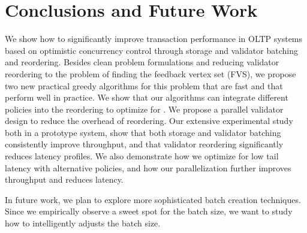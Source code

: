 \section{Conclusions and Future Work}\label{sec:conclusion}

We show how to significantly improve transaction performance in OLTP systems based on optimistic concurrency control through storage and validator batching and reordering. Besides clean problem formulations and
reducing validator reordering to the problem of finding the  feedback vertex set (FVS), we propose two new practical greedy algorithms for this problem
that are fast and that perform well in practice. We show that our algorithms can integrate different policies into the reordering to optimize for . We  propose a parallel validator design to reduce the overhead of reordering. Our extensive experimental study both in a prototype system,  show that both storage and validator batching consistently improve throughput, and that validator reordering 
significantly reduces latency profiles. We also demonstrate how we optimize for low tail latency with alternative policies, and how our parallelization further improves
throughput and reduces latency.

In future work, we plan to explore more sophisticated batch creation techniques. Since we empirically observe a sweet spot for the  batch size, we want to study how to intelligently adjusts the batch size. 
